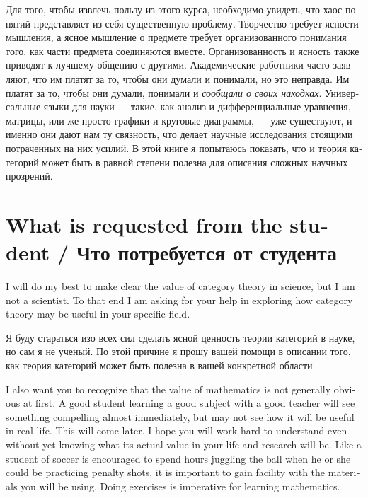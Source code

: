 \documentclass{book}
\theoremstyle{theoremENG}
\theoremstyle{lemmaENG}
\theoremstyle{propositionENG}
\theoremstyle{corollaryENG}
\theoremstyle{factENG}
\theoremstyle{remarkENG}
\theoremstyle{exampleENG}
\theoremstyle{warningENG}
\theoremstyle{questionENG}
\theoremstyle{guessENG}
\theoremstyle{answerENG}
\theoremstyle{constructionENG}
\theoremstyle{rulesENG}
\theoremstyle{excENG}
\theoremstyle{appENG}
\theoremstyle{definitionENG}
\theoremstyle{notationENG}
\theoremstyle{conjectureENG}
\theoremstyle{postulateENG}
\theoremstyle{theoremRUS}
\theoremstyle{lemmaRUS}
\theoremstyle{propositionRUS}
\theoremstyle{corollaryRUS}
\theoremstyle{factRUS}
\theoremstyle{remarkRUS}
\theoremstyle{exampleRUS}
\theoremstyle{warningRUS}
\theoremstyle{questionRUS}
\theoremstyle{guessRUS}
\theoremstyle{answerRUS}
\theoremstyle{constructionRUS}
\theoremstyle{rulesRUS}
\theoremstyle{excRUS}
\theoremstyle{appRUS}
\theoremstyle{definitionRUS}
\theoremstyle{notationRUS}
\theoremstyle{conjectureRUS}
\theoremstyle{postulateRUS}
\begin{document}
\begin{english}
\begin{russian}Для того, чтобы извлечь пользу из этого курса, необходимо увидеть, что хаос понятий представляет из себя существенную проблему. Творчество требует ясности мышления, а ясное мышление о предмете требует организованного понимания того, как части предмета соединяются вместе. Организованность и ясность также приводят к лучшему общению с другими. Академические работники часто заявляют, что им платят за то, чтобы они думали и понимали, но это неправда. Им платят за то, чтобы они думали, понимали и {\em сообщали о своих находках}. Универсальные языки для науки — такие, как анализ и дифференциальные уравнения, матрицы, или же просто графики и круговые диаграммы, — уже существуют, и именно они дают нам ту связность, что делает научные исследования стоящими потраченных на них усилий. В этой книге я попытаюсь показать, что и теория категорий может быть в равной степени полезна для описания сложных научных прозрений. \end{russian}


\section{What is requested from the student / Что потребуется от студента}

I will do my best to make clear the value of category theory in science, but I am not a scientist. To that end I am asking for your help in exploring how category theory may be useful in your specific field.

\begin{russian}Я буду стараться изо всех сил сделать ясной ценность теории категорий в науке, но сам я не ученый. По этой причине я прошу вашей помощи в описании того, как теория категорий может быть полезна в вашей конкретной области. \end{russian}

I also want you to recognize that the value of mathematics is not generally obvious at first. A good student learning a good subject with a good teacher will see something compelling almost immediately, but may not see how it will be useful in real life. This will come later. I hope you will work hard to understand even without yet knowing what its actual value in your life and research will be. Like a student of soccer is encouraged to spend hours juggling the ball when he or she could be practicing penalty shots, it is important to gain facility with the materials you will be using. Doing exercises is imperative for learning mathematics.


\end{english}
\end{document}
